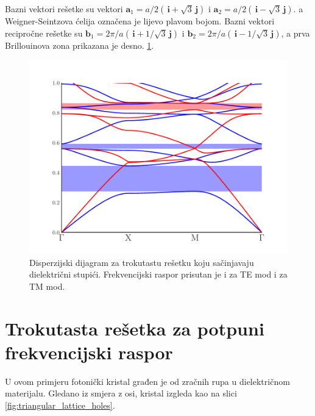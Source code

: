 \documentclass[utf8, seminar, numeric]{fer}
\begin{document}
Bazni vektori rešetke su vektori
${\mathbf{a}_1 = a/2 ( \, \mathbf{i} + \sqrt{3} \, \mathbf{j})}$ i
${\mathbf{a}_2 = a/2 ( \, \mathbf{i} - \sqrt{3} \, \mathbf{j})}$.
a Weigner-Seintzova ćelija označena je lijevo plavom bojom.
Bazni vektori recipročne rešetke su
${\mathbf{b}_1 = 2 \pi/a( \, \mathbf{i} + 1/\sqrt{3} \, \mathbf{j})}$ i
${\mathbf{b}_2 = 2 \pi/a( \, \mathbf{i} - 1/\sqrt{3} \, \mathbf{j})}$,
a prva Brillouinova zona prikazana je desno.
\ref{fig:triangular_band_diagram}.

\begin{figure}[ht]
	\centering
	\includegraphics[width = 0.8\linewidth]{./images/pdf/triangular_lattice_rods_band_diagram.pdf}
	\caption{Disperzijski dijagram za trokutastu rešetku koju sačinjavaju
	dielektrični stupići. Frekvencijski raspor prisutan je i za TE mod i za TM
	mod.}
	\label{fig:triangular_band_diagram}
\end{figure}

\FloatBarrier

\section {Trokutasta rešetka za potpuni frekvencijski raspor}

U ovom primjeru fotonički kristal građen je od zračnih rupa u dielektričnom
materijalu. Gledano iz smjera z osi, kristal izgleda kao na slici
\ref{fig:triangular_lattice_holes}.
\end{document}
